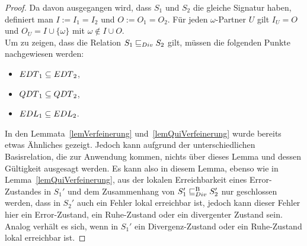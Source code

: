 \begin{proof}
  Da davon ausgegangen wird, dass $S_1$ und $S_2$ die gleiche Signatur haben,
  definiert man $I:=I_1=I_2$ und $O:=O_1=O_2$. Für jeden $\omega$-Partner $U$
  gilt $I_U=O$ und $O_U=I\cup\{\omega\}$ mit $\omega\notin I\cup O$.\\
  Um zu zeigen, dass die Relation $S_1\sqsubseteq _{Div} S_2$ gilt, müssen die folgenden
  Punkte nachgewiesen werden:
  \begin{itemize}
    \item $EDT{}_1\subseteq EDT{}_2$,
    \item $QDT{}_1\subseteq QDT{}_2$,
    \item $EDL{}_1\subseteq EDL{}_2$.
  \end{itemize}
  In den Lemmata~\ref{lemVerfeinerung} und~\ref{lemQuiVerfeinerung} wurde
  bereits etwas Ähnliches gezeigt. Jedoch kann aufgrund der unterschiedlichen
  Basisrelation, die zur Anwendung kommen, nichts über dieses Lemma und dessen
  Gültigkeit ausgesagt werden. Es kann also in diesem Lemma, ebenso wie
  in Lemma~\ref{lemQuiVerfeinerung}, aus der lokalen Erreichbarkeit eines
  Error-Zustandes in
  $S_1'$ und dem Zusammenhang von $S_1'\sqsubseteq _{Div}^\mathrm{B} S_2'$ nur
  geschlossen werden, dass in $S_2'$ auch ein Fehler lokal erreichbar ist,
  jedoch kann dieser Fehler hier ein Error-Zustand, ein Ruhe-Zustand oder ein
  divergenter Zustand sein. Analog verhält es sich, wenn in $S_1'$ ein
  Divergenz-Zustand oder ein Ruhe-Zustand lokal erreichbar ist.


\end{proof}
